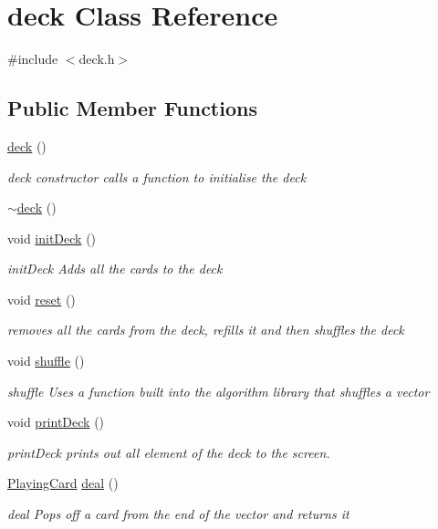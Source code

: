 \hypertarget{classdeck}{\section{deck Class Reference}
\label{classdeck}
}


{\ttfamily \#include $<$deck.\-h$>$}

\subsection*{Public Member Functions}
\begin{DoxyCompactItemize}
\item 
\hyperlink{classdeck_a2ff8465ba7b13201bdf650fe461b442e}{deck} ()
\begin{DoxyCompactList}\small\item\em deck constructor calls a function to initialise the deck \end{DoxyCompactList}\item 
\hyperlink{classdeck_a67daae3820e3a30970912ede1e334d5a}{$\sim$deck} ()
\item 
void \hyperlink{classdeck_a6cc2116abc53eebeff78bf993419e700}{init\-Deck} ()
\begin{DoxyCompactList}\small\item\em init\-Deck Adds all the cards to the deck \end{DoxyCompactList}\item 
void \hyperlink{classdeck_aee214eea45e2f7e7e641e43521c7e7a5}{reset} ()
\begin{DoxyCompactList}\small\item\em removes all the cards from the deck, refills it and then shuffles the deck \end{DoxyCompactList}\item 
void \hyperlink{classdeck_ae872ff1a6f7424f002cdf7e51988128d}{shuffle} ()
\begin{DoxyCompactList}\small\item\em shuffle Uses a function built into the algorithm library that shuffles a vector \end{DoxyCompactList}\item 
void \hyperlink{classdeck_a113901386bb98413916675859148b068}{print\-Deck} ()
\begin{DoxyCompactList}\small\item\em print\-Deck prints out all element of the deck to the screen. \end{DoxyCompactList}\item 
\hyperlink{classPlayingCard}{Playing\-Card} \hyperlink{classdeck_ab7f13200151036f6d614308ada9e6d01}{deal} ()
\begin{DoxyCompactList}\small\item\em deal Pops off a card from the end of the vector and returns it \end{DoxyCompactList}\end{DoxyCompactItemize}
